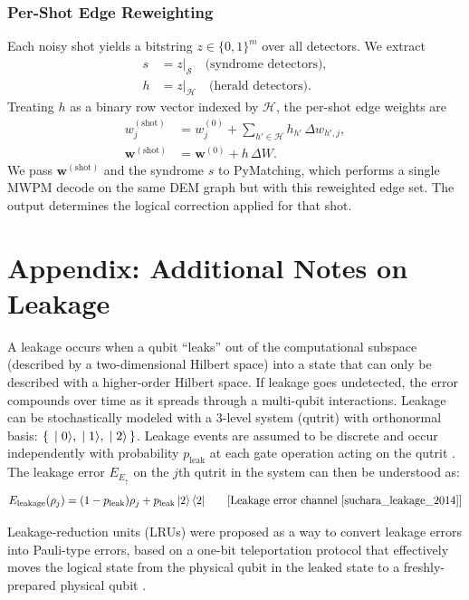 \documentclass[11pt, notitlepage, letterpaper]{article}
\begin{document}
\subsubsection*{Per-Shot Edge Reweighting}

Each noisy shot yields a bitstring $z\in\{0,1\}^m$ over all detectors. We extract
\begin{align}
    s & = z|_{\mathcal{S}} \quad\text{(syndrome detectors)}, \\
    h & = z|_{\mathcal{H}} \quad\text{(herald detectors)}.
\end{align}
Treating $h$ as a binary row vector indexed by $\mathcal{H}$, the per-shot edge weights are
\begin{align}
    w^{(\mathrm{shot})}_j
     & = w^{(0)}_j + \sum_{h' \in \mathcal{H}} h_{h'} \, \Delta w_{h',j}, \\
    \mathbf{w}^{(\mathrm{shot})}
     & = \mathbf{w}^{(0)} + h \, \Delta W .
\end{align}
We pass $\mathbf{w}^{(\mathrm{shot})}$ and the syndrome $s$ to PyMatching, which performs a single MWPM decode on the same DEM graph but with this reweighted edge set. The output determines the logical correction applied for that shot.



\section{Appendix: Additional Notes on Leakage}\label{appendix:leakage}
A leakage occurs when a qubit ``leaks'' out of the computational subspace (described by a two-dimensional Hilbert space) into a state that can only be described with a higher-order Hilbert space. If leakage goes undetected, the error compounds over time as it spreads through a multi-qubit interactions. Leakage can be stochastically modeled with a 3-level system (qutrit) with orthonormal basis: $\set{\ket{0}, \ket{1}, \ket{2}}$. Leakage events are assumed to be discrete and occur independently with probability $p_{\text{leak}}$ at each gate operation acting on the qutrit \cite{suchara_leakage_2014}. The leakage error $E_{E_{\uparrow}}$ on the $j$th qutrit in the system can then be understood as:
\begin{align}E_{\text{leakage}}(\rho_j) & = (1-p_{\text{leak}})\rho_j + p_{\text{leak}}\ket{2}\bra{2} & \quad \text{[Leakage error channel \cite{suchara_leakage_2014}]}
\end{align}

Leakage-reduction units (LRUs) were proposed as a way to convert leakage errors into Pauli-type errors, based on a one-bit teleportation protocol that effectively moves the logical state from the physical qubit in the leaked state to a freshly-prepared physical qubit \cite{suchara_leakage_2014}.
\end{document}
